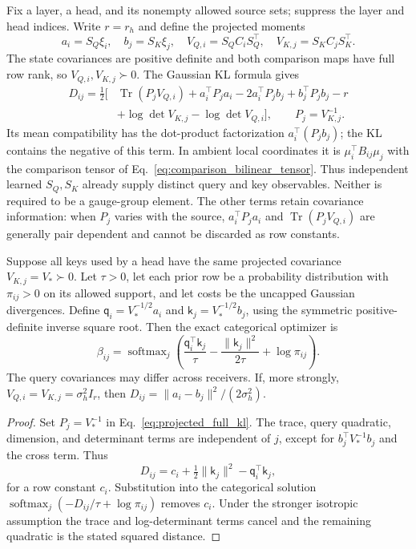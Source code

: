 \documentclass[twoside,11pt]{article}
\newcommand{\softmax}{\operatorname{softmax}}
\begin{document}
Fix a layer, a head, and its nonempty allowed source sets; suppress the layer and head indices. Write $r=r_h$ and define the projected moments
\begin{equation}
a_i=S_Q\xi_i,\quad b_j=S_K\xi_j,\quad
V_{Q,i}=S_QC_iS_Q^\top,\quad V_{K,j}=S_KC_jS_K^\top.
\label{eq:projected_qk_moments}
\end{equation}
The state covariances are positive definite and both comparison maps have full row rank, so $V_{Q,i},V_{K,j}\succ0$. The Gaussian KL formula gives
\begin{align}
D_{ij}=\frac12\bigl[&\operatorname{Tr}(P_jV_{Q,i})
+a_i^\top P_ja_i-2a_i^\top P_jb_j+b_j^\top P_jb_j-r\nonumber\\
&+\log\det V_{K,j}-\log\det V_{Q,i}\bigr],
\qquad P_j=V_{K,j}^{-1}.
\label{eq:projected_full_kl}
\end{align}
Its mean compatibility has the dot-product factorization $a_i^\top(P_jb_j)$; the KL contains the negative of this term. In ambient local coordinates it is $\mu_i^\top B_{ij}\mu_j$ with the comparison tensor of Eq.~\eqref{eq:comparison_bilinear_tensor}. Thus independent learned $S_Q,S_K$ already supply distinct query and key observables. Neither is required to be a gauge-group element. The other terms retain covariance information: when $P_j$ varies with the source, $a_i^\top P_ja_i$ and $\operatorname{Tr}(P_jV_{Q,i})$ are generally pair dependent and cannot be discarded as row constants.

\begin{proposition}
\label{prop:projected_dot_product}
Suppose all keys used by a head have the same projected covariance $V_{K,j}=V_*\succ0$. Let $\tau>0$, let each prior row be a probability distribution with $\pi_{ij}>0$ on its allowed support, and let costs be the uncapped Gaussian divergences. Define $\mathsf q_i=V_*^{-1/2}a_i$ and $\mathsf k_j=V_*^{-1/2}b_j$, using the symmetric positive-definite inverse square root. Then the exact categorical optimizer is
\begin{equation}
\beta_{ij}=\softmax_j\left(
\frac{\mathsf q_i^\top\mathsf k_j}{\tau}
-\frac{\|\mathsf k_j\|^2}{2\tau}
+\log\pi_{ij}\right).
\label{eq:main_dot_product_scope}
\end{equation}
The query covariances may differ across receivers. If, more strongly, $V_{Q,i}=V_{K,j}=\sigma_h^2I_r$, then $D_{ij}=\|a_i-b_j\|^2/(2\sigma_h^2)$.
\end{proposition}
\begin{proof}
Set $P_j=V_*^{-1}$ in Eq.~\eqref{eq:projected_full_kl}. The trace, query quadratic, dimension, and determinant terms are independent of $j$, except for $b_j^\top V_*^{-1}b_j$ and the cross term. Thus
\begin{equation}
D_{ij}=c_i+\tfrac12\|\mathsf k_j\|^2
-\mathsf q_i^\top\mathsf k_j,
\label{eq:projected_kl_row_decomposition}
\end{equation}
for a row constant $c_i$. Substitution into the categorical solution $\softmax_j(-D_{ij}/\tau+\log\pi_{ij})$ removes $c_i$. Under the stronger isotropic assumption the trace and log-determinant terms cancel and the remaining quadratic is the stated squared distance.
\end{proof}
\end{document}
